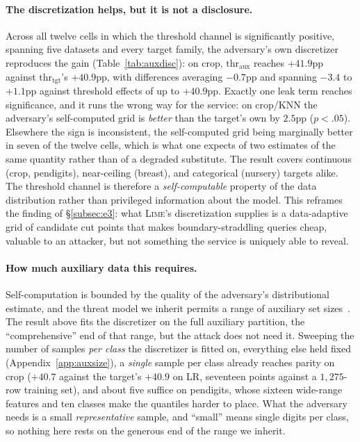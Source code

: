 \documentclass[sigconf,anonymous,review]{acmart}
\begin{document}
\paragraph{The discretization helps, but it is not a disclosure.} Across all twelve cells in which the
threshold channel is significantly positive, spanning five datasets and every target family, the adversary's own discretizer reproduces the gain (Table~\ref{tab:auxdisc}): on crop,
$\text{thr}_{\text{aux}}$ reaches $+41.9$pp against $\text{thr}_{\text{tgt}}$'s $+40.9$pp, with
differences averaging $-0.7$pp and spanning $-3.4$ to $+1.1$pp against threshold effects of up to
$+40.9$pp. Exactly one leak term reaches significance, and it runs the wrong way for the service:
on crop/KNN the adversary's self-computed grid is \emph{better} than the target's own by $2.5$pp
($p{<}.05$). Elsewhere the sign is inconsistent, the self-computed grid being marginally better in
seven of the twelve cells, which is what one expects of two estimates of the same quantity rather
than of a degraded substitute.
The result covers continuous (crop, pendigits), near-ceiling (breast), and categorical (nursery) targets alike. The threshold channel is therefore a
\emph{self-computable} property of the data distribution rather than privileged information about the
model. This reframes the finding of \S\ref{subsec:e3}: what \textsc{Lime}'s discretization supplies is
a data-adaptive grid of candidate cut points that makes boundary-straddling queries cheap, valuable to an attacker, but not something the service is uniquely able to reveal.

\paragraph{How much auxiliary data this requires.} Self-computation is bounded by the quality of the
adversary's distributional estimate, and the threat model we inherit permits a range of auxiliary set
sizes~\cite{oksuz2024autolycus}. The result above fits the discretizer on the full auxiliary
partition, the ``comprehensive'' end of that range, but the attack does not need it. Sweeping the
number of samples \emph{per class} the discretizer is fitted on, everything else held fixed
(Appendix~\ref{app:auxsize}), a \emph{single} sample per class already reaches parity on crop
($+40.7$ against the target's $+40.9$ on LR, seventeen points against a $1{,}275$-row training set),
and about five suffice on pendigits, whose sixteen wide-range features and ten classes make the
quantiles harder to place. What the adversary needs is a small \emph{representative} sample, and
``small'' means single digits per class, so nothing here rests on the generous end of the range we
inherit.
\end{document}
